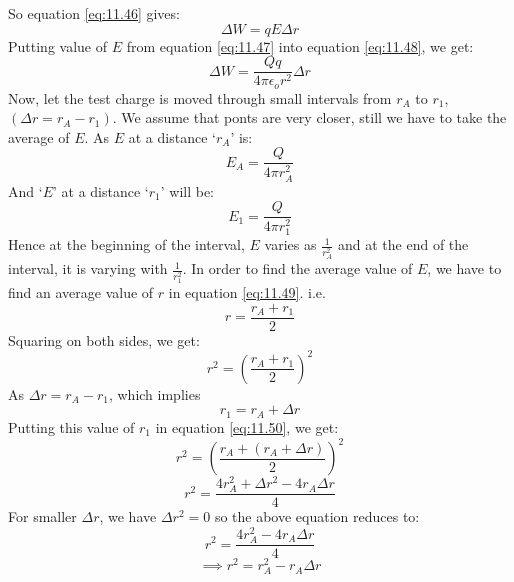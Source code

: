 So equation \ref{eq:11.46} gives:
\begin{equation}\label{eq:11.48}
  \Delta W = qE\Delta r
\end{equation}
Putting value of $E$ from equation \ref{eq:11.47} into equation \ref{eq:11.48},
we get:
\begin{equation}\label{eq:11.49}
  \Delta W = \frac{Qq}{4\pi\epsilon_{o} r^{2}} \Delta r
\end{equation}
Now, let the test charge is moved through small intervals from $r_{A}$
to $r_{1}$, $(\Delta r = r_{A} - r_{1})$. We assume that ponts are very closer,
still we have to take the average of $E$. As $E$ at a distance `$r_{A}$' is:
\begin{equation}
  E_{A} = \frac{Q}{4\pi r_{A}^{2}} \nonumber
\end{equation}
And `$E$' at a distance `$r_{1}$' will be:
\begin{equation}
  E_{1} = \frac{Q}{4\pi r_{1}^{2}} \nonumber
\end{equation}
Hence at the beginning of the interval, $E$ varies as $\frac{1}{r_{A}^{2}}$ and at the end
of the interval, it is varying with $\frac{1}{r_{1}^{2}}$. In order to find the average
value of $E$, we have to find an average value of $r$ in equation \ref{eq:11.49}. i.e.
\begin{equation}
  r = \frac{r_{A}+r_{1}}{2} \nonumber
\end{equation}
Squaring on both sides, we get:
\begin{equation}\label{eq:11.50}
  r^{2} = (\frac{r_{A}+r_{1}}{2})^{2} 
\end{equation}
As $\Delta r = r_{A} - r_{1}$, which implies 
\begin{equation}
  r_{1} = r_{A} + \Delta r \nonumber
\end{equation}
Putting this value of $r_{1}$ in equation \ref{eq:11.50}, we get:
\begin{equation}
  r^{2} = (\frac{r_{A}+(r_{A} + \Delta r)}{2})^{2} \nonumber
\end{equation}
\begin{equation}
  r^{2} = \frac{4r_{A}^{2} + \Delta r^2 -4r_{A}\Delta r}{4} \nonumber
\end{equation}
For smaller $\Delta r$, we have $\Delta r^{2} = 0$ so the above equation reduces
to:
\begin{equation}
  r^{2} = \frac{4r_{A}^{2} - 4r_{A}\Delta r}{4} \nonumber
\end{equation}
\begin{equation}\label{eq:11.51}
\implies r^{2} = r_{A}^{2} - r_{A}\Delta r 
\end{equation}
